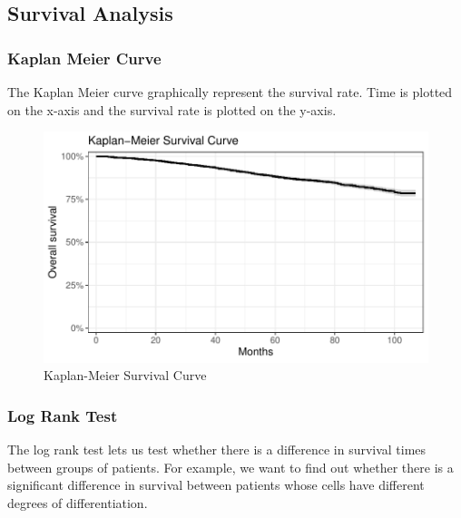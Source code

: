 \documentclass[
]{article}
\begin{document}
\newpage

\subsection{Survival Analysis}\label{survival-analysis}

\subsubsection{Kaplan Meier Curve}\label{kaplan-meier-curve}

The Kaplan Meier curve graphically represent the survival rate. Time is
plotted on the x-axis and the survival rate is plotted on the y-axis.

\begin{figure}
\includegraphics[width=0.9\linewidth]{Appendix_files/figure-latex/km_curve-1} \caption{Kaplan-Meier Survival Curve}\label{fig:km_curve}
\end{figure}

\subsubsection{Log Rank Test}\label{log-rank-test}

The log rank test lets us test whether there is a difference in survival
times between groups of patients. For example, we want to find out
whether there is a significant difference in survival between patients
whose cells have different degrees of differentiation.
\end{document}
